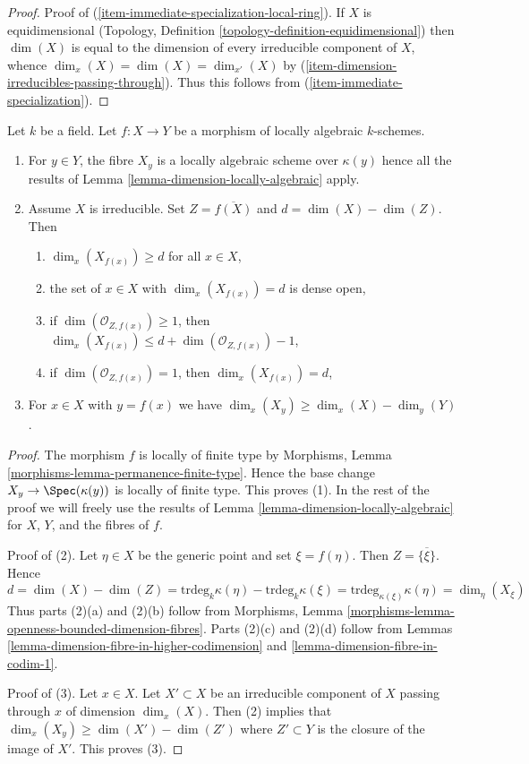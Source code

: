 \begin{proof}
\medskip\noindent
Proof of (\ref{item-immediate-specialization-local-ring}).
If $X$ is equidimensional
(Topology, Definition \ref{topology-definition-equidimensional})
then $\dim(X)$ is equal to the dimension of every irreducible
component of $X$, whence $\dim_x(X) = \dim(X) = \dim_{x'}(X)$
by (\ref{item-dimension-irreducibles-passing-through}).
Thus this follows from (\ref{item-immediate-specialization}).
\end{proof}

\begin{lemma}
\label{lemma-dimension-fibres-locally-algebraic}
Let $k$ be a field. Let $f : X \to Y$ be a morphism of locally algebraic
$k$-schemes.
\begin{enumerate}
\item For $y \in Y$, the fibre $X_y$ is a locally
algebraic scheme over $\kappa(y)$ hence all the results of
Lemma \ref{lemma-dimension-locally-algebraic} apply.
\item Assume $X$ is irreducible. Set $Z = \overline{f(X)}$ and
$d = \dim(X) - \dim(Z)$. Then
\begin{enumerate}
\item $\dim_x(X_{f(x)}) \geq d$ for all $x \in X$,
\item the set of $x \in X$ with $\dim_x(X_{f(x)}) = d$ is dense open,
\item if $\dim(\mathcal{O}_{Z, f(x)}) \geq 1$, then
$\dim_x(X_{f(x)}) \leq d + \dim(\mathcal{O}_{Z, f(x)}) - 1$,
\item if $\dim(\mathcal{O}_{Z, f(x)}) = 1$, then $\dim_x(X_{f(x)}) = d$,
\end{enumerate}
\item For $x \in X$ with $y = f(x)$ we have
$\dim_x(X_y) \geq \dim_x(X) - \dim_y(Y)$.
\end{enumerate}
\end{lemma}

\begin{proof}
The morphism $f$ is locally of finite type by
Morphisms, Lemma \ref{morphisms-lemma-permanence-finite-type}.
Hence the base change $X_y \to \Spec(\kappa(y))$ is locally
of finite type. This proves (1).
In the rest of the proof we will freely use the results
of Lemma \ref{lemma-dimension-locally-algebraic} for $X$, $Y$, and
the fibres of $f$.

\medskip\noindent
Proof of (2). Let $\eta \in X$ be the generic point and set
$\xi = f(\eta)$. Then $Z = \overline{\{\xi\}}$. Hence
$$
d = \dim(X) - \dim(Z) =
\text{trdeg}_k \kappa(\eta) - \text{trdeg}_k \kappa(\xi) =
\text{trdeg}_{\kappa(\xi)} \kappa(\eta) = \dim_\eta(X_\xi)
$$
Thus parts (2)(a) and (2)(b) follow from
Morphisms, Lemma \ref{morphisms-lemma-openness-bounded-dimension-fibres}.
Parts (2)(c) and (2)(d) follow from
Lemmas \ref{lemma-dimension-fibre-in-higher-codimension} and
\ref{lemma-dimension-fibre-in-codim-1}.

\medskip\noindent
Proof of (3). Let $x \in X$. Let $X' \subset X$ be an irreducible component
of $X$ passing through $x$ of dimension $\dim_x(X)$. Then (2) implies that
$\dim_x(X_y) \geq \dim(X') - \dim(Z')$ where $Z' \subset Y$
is the closure of the image of $X'$. This proves (3).
\end{proof}

